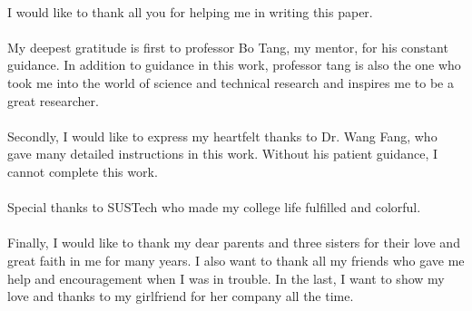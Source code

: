 \paragraph{}
    I would like to thank all you for helping me in writing this paper.
    \paragraph{}
    My deepest gratitude is first to professor Bo Tang, my mentor, for his constant guidance. In addition to guidance in this work, professor tang is also the one who 
    took me into the world of science and technical research and inspires me to be a great researcher.
    \paragraph{}
    Secondly, I would like to express my heartfelt thanks to Dr. Wang Fang, who gave many detailed instructions in this work. Without his patient guidance, I 
    cannot complete this work.
    \paragraph{}
    Special thanks to SUSTech who made my college life fulfilled and colorful. 
    \paragraph{}
    Finally, I would like to thank my dear parents and three sisters for their love and great faith in me for many years. I also want to thank all my friends who 
    gave me help and encouragement when I was in trouble. In the last, I want to show my love and thanks to my girlfriend for her company all the time.

